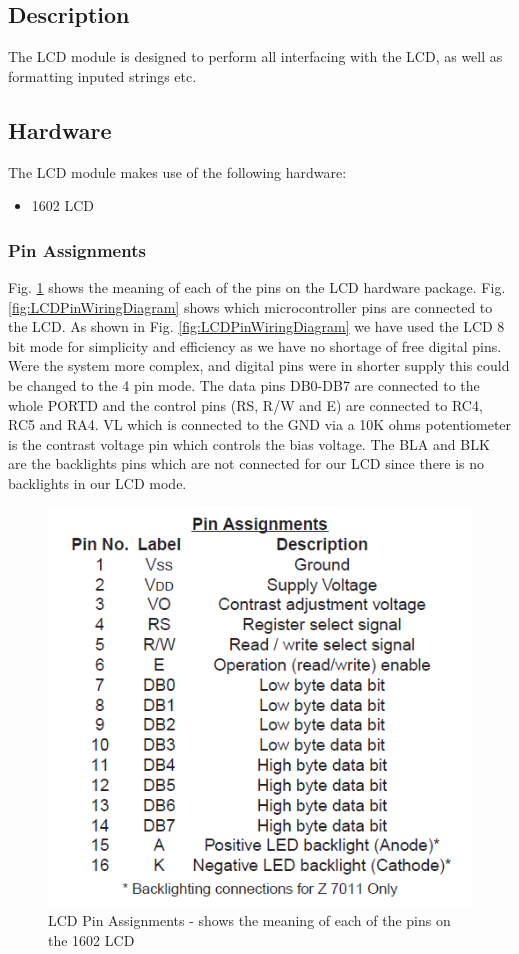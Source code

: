\documentclass[]{report}
\begin{document}
\subsection{Description}
The LCD module is designed to perform all interfacing with the LCD, as well as formatting inputed strings etc.

\subsection{Hardware}
The LCD module makes use of the following hardware:
\begin{itemize}
	\item 1602 LCD
\end{itemize}

\subsubsection{Pin Assignments}
Fig. \ref{fig:LCDPinAssignments} shows the meaning of each of the pins on the LCD hardware package. Fig. \ref{fig:LCDPinWiringDiagram} shows which microcontroller pins are connected to the LCD. As shown in Fig. \ref{fig:LCDPinWiringDiagram} we have used the LCD 8 bit mode for simplicity and efficiency as we have no shortage of free digital pins. Were the system more complex, and digital pins were in shorter supply this could be changed to the 4 pin mode. \newline
The data pins DB0-DB7 are connected to the whole PORTD and the control pins (RS, R/W and E) are connected to RC4, RC5 and RA4. VL which is connected to the GND via a 10K ohms potentiometer is the contrast voltage pin which controls the bias voltage. The BLA and BLK are the backlights pins which are not connected for our LCD since there is no backlights in our LCD mode.

\begin{figure}
\centering
\includegraphics[width=0.7\linewidth]{"../Diagrams/LCD Pin Assignments"}
\caption{LCD Pin Assignments - shows the meaning of each of the pins on the 1602 LCD}
\label{fig:LCDPinAssignments}
\end{figure}
\end{document}
